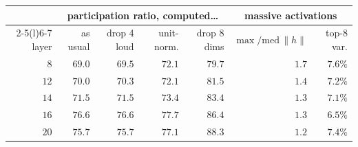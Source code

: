 \begin{tabular}{@{}rrrrrrr@{}}
\toprule
& \multicolumn{4}{c}{participation ratio, computed\ldots} & \multicolumn{2}{c}{massive activations} \\
\cmidrule(lr){2-5}\cmidrule(l){6-7}
layer & as usual & drop 4 loud & unit-norm. & drop 8 dims & $\max/\mathrm{med}\,\|h\|$ & top-8 var. \\
\midrule
$8$ & $69.0$ & $69.5$ & $72.1$ & $79.7$ & $1.7$ & $7.6\%$ \\
$12$ & $70.0$ & $70.3$ & $72.1$ & $81.5$ & $1.4$ & $7.2\%$ \\
$14$ & $71.5$ & $71.5$ & $73.4$ & $83.4$ & $1.3$ & $7.1\%$ \\
$16$ & $76.6$ & $76.6$ & $77.7$ & $86.4$ & $1.3$ & $6.5\%$ \\
$20$ & $75.7$ & $75.7$ & $77.1$ & $88.3$ & $1.2$ & $7.4\%$ \\
\bottomrule
\end{tabular}
